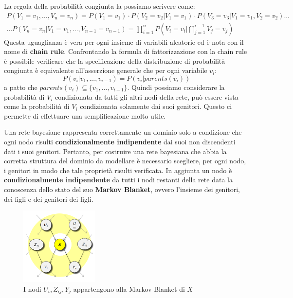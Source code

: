 La regola della probabilità congiunta la possiamo scrivere come:
\begin{equation*}
    \begin{aligned}
        P(V_1= v_1,...,V_n = v_n) = P(V_1 = v_1) \cdot P(V_2 = v_2|V_1 = v_1)
        \cdot P(V_3 = v_3|V_1 = v_1,V_2 = v_2) \dots \\
        \dots P(V_n = v_n|V_1 = v_1, \dots,V_{n-1}=v_{n-1}) = \prod_{i=1}^{n}
        P(V_i = v_i| \bigcap_{j = 1}^{i - 1} V_j= v_j)
    \end{aligned}
\end{equation*}
Questa uguaglianza è vera per ogni insieme di variabili aleatorie ed è nota con
il nome di \textbf{chain rule}. Confrontando la formula di fattorizzazione con
la chain rule è possibile verificare che la specificazione della distribuzione
di probabilità congiunta è equivalente all'asserzione generale che per ogni
variabile $v_i$:
\begin{equation}
    P(v_i|v_1,...,v_{i-1}) = P(v_i|parents(v_i))
\end{equation}
a patto che $parents(v_i) \subseteq \{v_1,...,v_{i-1}\}$. Quindi possiamo
considerare la probabilità di $V_i$ condizionata da tutti gli altri nodi della
rete, può essere vista come la probabilità di $V_i$ condizionata solamente dai
suoi genitori. Questo ci permette di effettuare una semplificazione molto utile.

Una rete bayesiane rappresenta correttamente un dominio solo a condizione che ogni
nodo risulti \textbf{condizionalmente indipendente} dai suoi non discendenti
dati i suoi genitori. Pertanto, per costruire una rete bayesiana che abbia la
corretta struttura del dominio da modellare è necessario scegliere, per ogni nodo,
i genitori in modo che tale proprietà risulti verificata. In aggiunta un nodo
è \textbf{condizionalmente indipendente} da tutti i nodi restanti della rete data
la conoscenza dello stato del suo \textbf{Markov Blanket}, ovvero l'insieme dei
genitori, dei figli e dei genitori dei figli.
\begin{figure}[!ht]
    \centering
    \includegraphics[width=0.35\textwidth]{./img/Reti/MarkovBlanket.png}
    \caption{I nodi $U_i, Z_{ij}, Y_j$ appartengono alla Markov Blanket di $X$}
    \label{fig:MarkovBlanket}
\end{figure}

